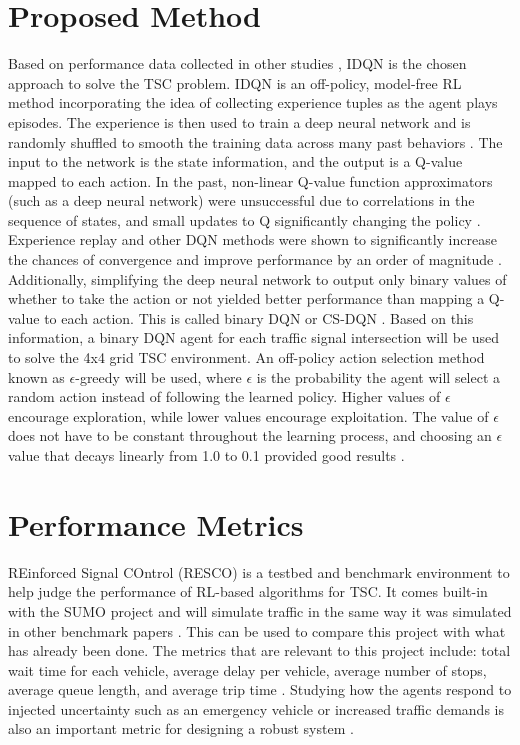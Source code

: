 \documentclass[letterpaper]{article} %
\begin{document}
\section{Proposed Method}
Based on performance data collected in other studies \cite{ault2021reinforcement} \cite{Ghanadbashi2023},
IDQN is the chosen approach to solve the TSC problem.
IDQN is an off-policy, model-free RL method incorporating the idea of collecting experience tuples as the agent plays episodes.
The experience is then used to train a deep neural network and is randomly shuffled to smooth the training data across many past behaviors \cite{DBLP:journals/corr/MnihKSGAWR13}.
The input to the network is the state information, and the output is a Q-value mapped to each action.
In the past, non-linear Q-value function approximators (such as a deep neural network) were unsuccessful due to correlations in the sequence of states, and small updates to Q significantly changing the policy \cite{hafiz2020deep}.
Experience replay and other DQN methods were shown to significantly increase the chances of convergence and improve performance by an order of magnitude \cite{Mnih2015}.
Additionally, simplifying the deep neural network to output only binary values of whether to take the action or not yielded better performance than mapping a Q-value to each action. This is called binary DQN or CS-DQN \cite{hafiz2020deep}.
Based on this information, a binary DQN agent for each traffic signal intersection will be used to solve the 4x4 grid TSC environment.
An off-policy action selection method known as $\epsilon$-greedy will be used, where $\epsilon$ is the probability the agent will select a random action instead of following the learned policy.
Higher values of $\epsilon$ encourage exploration, while lower values encourage exploitation.
The value of $\epsilon$ does not have to be constant throughout the learning process, and choosing an $\epsilon$ value that decays linearly from 1.0 to 0.1 provided good results \cite{Mnih2015}.

\section{Performance Metrics}
REinforced Signal COntrol (RESCO) is a testbed and benchmark environment to help judge the performance of RL-based algorithms for TSC. It comes built-in with the SUMO project and will simulate traffic in the same way it was simulated in other benchmark papers \cite{ault2021reinforcement}. This can be used to compare this project with what has already been done.
The metrics that are relevant to this project include: total wait time for each vehicle, average delay per vehicle, average number of stops, average queue length, and average trip time \cite{Reza2023}.
Studying how the agents respond to injected uncertainty such as an emergency vehicle or increased traffic demands is also an important metric for designing a robust system \cite{DBLP:journals/corr/abs-2004-04778}.
\end{document}
